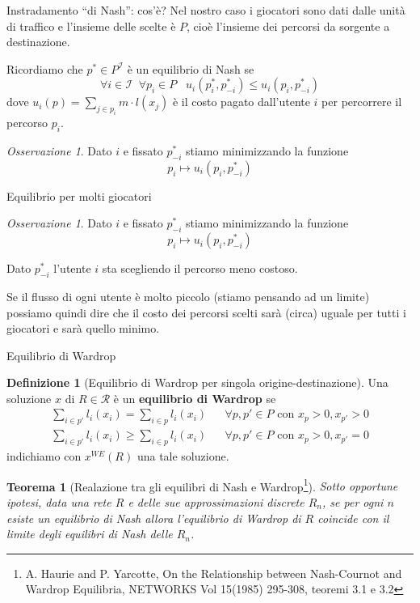 \documentclass{beamer}
\newcounter{counter1}
\theoremstyle{plain}
\newtheorem{myteo}[counter1]{Teorema}
\theoremstyle{definition}
\newtheorem{mydef}[counter1]{Definizione}
\theoremstyle{remark}
\newtheorem{myoss}[counter1]{Osservazione}
\newcommand{\pa}[1]{\left(#1\right)}
\begin{document}
\begin{frame}{Instradamento ``di Nash'': cos'è?}
  Nel nostro caso i giocatori sono dati dalle unità di traffico e
  l'insieme delle scelte è $P$, cioè l'insieme dei percorsi da
  sorgente a destinazione.
  \vfill
  
  Ricordiamo che $p^* \in P^{\mathcal{I}}$ è un equilibrio di Nash se
  \[ \forall i\in \mathcal{I}\;\; \forall p_i \in P \;\;\;
    u_i\pa{p^*_i,p^*_{-i}} \le u_i\pa{p_i,p^*_{-i}} \]
  dove $u_i\pa{p} = \sum _{j\in p_i} m\cdot l(x_j)$ è il costo pagato
  dall'utente $i$ per percorrere il percorso $p_i$.

  \begin{myoss}
    Dato $i$ e fissato $p^*_{-i}$ stiamo minimizzando la funzione
    \[ p_i \longmapsto u_i\pa{p_i,p^*_{-i}} \]
  \end{myoss}
\end{frame}

\begin{frame}{Equilibrio per molti giocatori}
  \begin{myoss}
    Dato $i$ e fissato $p^*_{-i}$ stiamo minimizzando la funzione
    \[ p_i \longmapsto u_i\pa{p_i,p^*_{-i}} \]
  \end{myoss}
  Dato $p^*_{-i}$ l'utente $i$ sta scegliendo il percorso meno
  costoso.
  \vfill
  
  Se il flusso di ogni utente è molto piccolo (stiamo pensando ad un
  limite) possiamo quindi dire che il costo dei percorsi scelti sarà
  (circa) uguale per tutti i giocatori e sarà quello minimo.
\end{frame}

\begin{frame}{Equilibrio di Wardrop}
  \begin{mydef}[Equilibrio di Wardrop per singola origine-destinazione]
    Una soluzione $x$ di $R\in \mathcal{R}$ è un \textbf{equilibrio di
      Wardrop} se
    \[
      \begin{matrix}
        \sum _{i\in p'} l_i(x_i) = \sum _{i\in p} l_i(x_i) & & \forall
        p,p'\in P \text{ con } x_p >0, x_{p'} >0 \\
        \sum _{i\in p'} l_i(x_i) \ge \sum _{i\in p} l_i(x_i) & & \forall
        p,p'\in P \text{ con } x_p >0, x_{p'} =0 
      \end{matrix}
    \]
    indichiamo con $x^{WE}(R)$ una tale soluzione.
  \end{mydef}

  \begin{myteo}[Realazione tra gli equilibri di Nash e
    Wardrop\footnote{A. Haurie and P. Yarcotte, On the Relationship
      between Nash-Cournot and Wardrop Equilibria, NETWORKS Vol 15(1985) 295-308, teoremi 3.1 e 3.2}]
    Sotto opportune ipotesi, data una rete $R$ e delle sue approssimazioni
    discrete $R_n$, se per ogni $n$ esiste un equilibrio di Nash allora
    l'equilibrio di Wardrop di $R$ coincide con il limite degli equilibri di
    Nash delle $R_n$.
  \end{myteo}
\end{frame}
\end{document}
